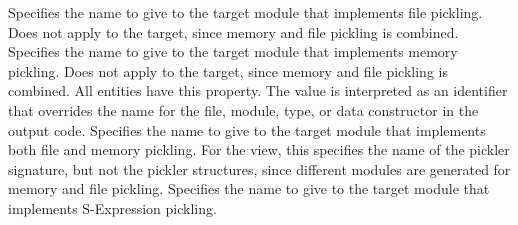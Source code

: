 \begin{description}
    Specifies the name to give to the target module that implements file pickling.
    Does not apply to the \Cplusplus{} target, since memory and file pickling is
    combined.
    Specifies the name to give to the target module that implements memory pickling.
    Does not apply to the \Cplusplus{} target, since memory and file pickling is
    combined.
    All entities have this property.  The value is interpreted as an identifier
    that overrides the name for the file, module, type, or data constructor
    in the output code.
    Specifies the name to give to the target module that implements both file
    and memory pickling.
    For the \sml{} view, this specifies the name of the pickler signature, but
    not the pickler structures, since different modules are generated
    for memory and file pickling.
    Specifies the name to give to the target module that implements S-Expression pickling.
\end{description}%

